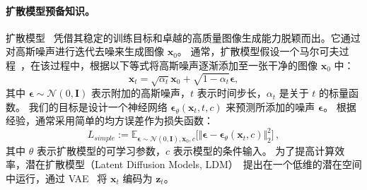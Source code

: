 \paragraph{扩散模型预备知识。}
扩散模型~\cite{ho2020denoising} 凭借其稳定的训练目标和卓越的高质量图像生成能力脱颖而出。它通过对高斯噪声进行迭代去噪来生成图像 $\bm{x}_0$。
通常，扩散模型假设一个马尔可夫过程~\cite{rabiner1989tutorial}，在该过程中，根据以下等式将高斯噪声逐渐添加至一张干净的图像 $\bm{x}_0$ 中：
\begin{equation}
    \bm{x}_t = \sqrt{\alpha_t} {\bm{x}}_{0} + \sqrt{1-\alpha_t} \bm{\epsilon} ,
\label{eq:forward}
\end{equation}
其中 $\bm{\epsilon}\!\sim\!\mathcal{N}(0, \mathbf{I})$ 表示附加的高斯噪声，$t$ 表示时间步长，$\alpha_t$ 是关于 $t$ 的标量函数。
我们的目标是设计一个神经网络 $\bm{\epsilon}_\theta(\bm{x}_t, t, c)$ 来预测所添加的噪声 $\bm{\epsilon}$。
根据经验，通常采用简单的均方误差作为损失函数：
\begin{equation}
    L_{simple} := \mathbb{E}_{\bm{\epsilon} \sim \mathcal{N}(0, \mathbf{I}), \bm{x}_0, c}\Big[ \Vert \bm{\epsilon} - \bm{\epsilon}_\theta(\bm{x}_{t}, c) \Vert_{2}^{2}\Big] \, ,
    \label{eq:LDM_loss}
\end{equation}
其中 $\theta$ 表示扩散模型的可学习参数，$c$ 表示模型的条件输入。
为了提高计算效率，潜在扩散模型（Latent Diffusion Models, LDM）~\cite{rombach2022high}提出在一个低维的潜在空间中运行，通过 VAE~\cite{esser2021taming} 将 $\bm{x}_t$ 编码为 $\bm{z}_t$。

